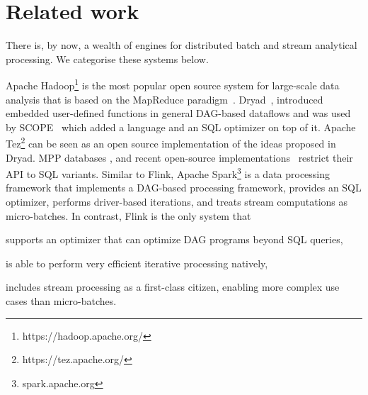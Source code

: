 
\section{Related work}
\label{sec:related}
There is, by now, a wealth of engines for distributed batch and stream analytical processing. We categorise these systems below. 

 Apache Hadoop\footnote{https://hadoop.apache.org/} is the most popular open source system for large-scale data analysis that is based on the MapReduce paradigm~\cite{DBLP:journals/cacm/DeanG08}. Dryad~\cite{isard2007dryad}, introduced embedded user-defined functions in general DAG-based dataflows and was used by SCOPE~\cite{scopeOptimizer} which added a language and an SQL optimizer on top of it. Apache Tez\footnote{https://tez.apache.org/} can be seen as an open source implementation of the ideas proposed in Dryad. MPP databases \cite{dewitt1990gamma}, and recent open-source implementations~\cite{CUSTOM:web/Drill,kornacker2015impala} restrict their API to SQL variants. Similar to Flink, Apache Spark\footnote{spark.apache.org} is a data processing framework that implements a DAG-based processing framework, provides an SQL optimizer, performs driver-based iterations, and treats stream computations as micro-batches. In contrast, Flink is the only system that 
\begin{inparaenum}[i)]
  \item supports an optimizer that can optimize DAG programs beyond SQL queries,
  \item is able to perform very efficient iterative processing natively,
  \item includes stream processing as a first-class citizen, enabling more complex use cases than micro-batches.
\end{inparaenum}


